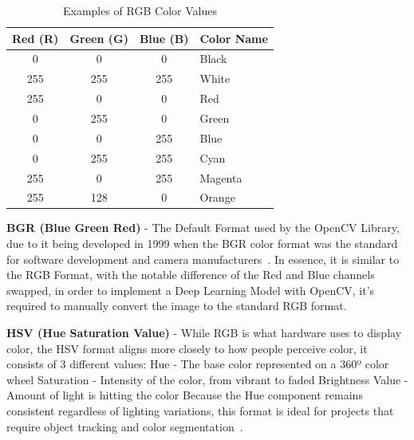 \begin{table}[h]
\centering
\renewcommand{\arraystretch}{1.2} 
\begin{tabular}{|c|c|c|l|}
\hline
\textbf{Red (R)} & \textbf{Green (G)} & \textbf{Blue (B)} & \textbf{Color Name} \\ \hline
0                & 0                  & 0                  & Black               \\ \hline
255              & 255                & 255                & White               \\ \hline
255              & 0                  & 0                  & Red                 \\ \hline
0                & 255                & 0                  & Green               \\ \hline
0                & 0                  & 255                & Blue                \\ \hline
0                & 255                & 255                & Cyan                \\ \hline
255              & 0                  & 255                & Magenta             \\ \hline
255              & 128                & 0                  & Orange              \\ \hline
\end{tabular}
\caption{Examples of RGB Color Values}
\label{tab:rgb_values}
\end{table}

\textbf{BGR (Blue Green Red)} - 
The Default Format used by the OpenCV Library, due to it being developed in 1999 when the BGR color format was the standard for software development and camera manufacturers~\cite{mallick_bgr}. In essence, it is similar to the RGB Format, with the notable difference of the Red and Blue channels swapped, in order to implement a Deep Learning Model with OpenCV, it's required to manually convert the image to the standard RGB format.

\vspace{0.3cm}
\textbf{HSV (Hue Saturation Value)} - 
While RGB is what hardware uses to display color, the HSV format aligns more closely to how people perceive color, it consists of 3 different values:
\newline Hue - The base color represented on a 360º color wheel
\newline Saturation - Intensity of the color, from vibrant to faded
\newline Brightness Value - Amount of light is hitting the color
\newline Because the Hue component remains consistent regardless of lighting variations, this format is ideal for projects that require object tracking and color segmentation~\cite{roboflow_colorspaces, mopidevi2023hand}.

